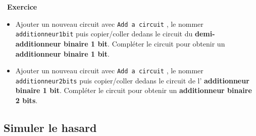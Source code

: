 \documentclass[
  11pt,
]{article}
\newcommand{\passthrough}[1]{#1}
\providecommand{\tightlist}{%
  \setlength{\itemsep}{0pt}\setlength{\parskip}{0pt}}
\newcounter{exo}
\newenvironment{exercice}[1]
{\par \medskip   \addtocounter{exo}{1} \noindent  
\begin{bclogo}[arrondi =0.1,   noborder = true, logo=\bccrayon, marge=4]{~\textbf{Exercice} \textbf{\theexo} {\itshape #1} }  \par}
{
\end{bclogo}
 \par \bigskip }
\begin{document}
\begin{exercice}{}
\begin{enumerate}
  \begin{itemize}
  \tightlist
  \item
    Ajouter un nouveau circuit avec
    \passthrough{\lstinline!Add a circuit!} , le nommer
    \passthrough{\lstinline!additionneur1bit!} puis copier/coller dedans
    le circuit du \textbf{demi-additionneur binaire 1 bit}. Compléter le
    circuit pour obtenir un \textbf{additionneur binaire 1 bit}.
  \item
    Ajouter un nouveau circuit avec
    \passthrough{\lstinline!Add a circuit!} , le nommer
    \passthrough{\lstinline!additionneur2bits!} puis copier/coller
    dedans le circuit de l' \textbf{additionneur binaire 1 bit}.
    Compléter le circuit pour obtenir un \textbf{additionneur binaire 2
    bits}.
  \end{itemize}
\end{enumerate}

\end{exercice}

\hypertarget{simuler-le-hasard}{%
\subsection{Simuler le hasard}\label{simuler-le-hasard}}
\end{document}
